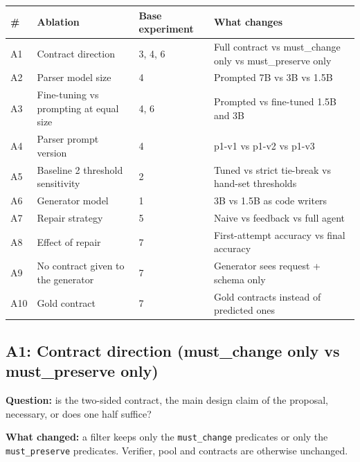 \documentclass[11pt]{article}
\begin{document}
\begin{table}[!tp]
\centering\footnotesize\setlength{\tabcolsep}{3pt}\renewcommand{\arraystretch}{1.1}
\begin{tabularx}{\textwidth}{l>{\raggedright\arraybackslash}Xl>{\raggedright\arraybackslash}X}
\toprule
\textbf{\#} & \textbf{Ablation} & \textbf{Base experiment} & \textbf{What changes} \\
\midrule
A1 & Contract direction & 3, 4, 6 & Full contract vs must\_change only vs must\_preserve only \\
A2 & Parser model size & 4 & Prompted 7B vs 3B vs 1.5B \\
A3 & Fine-tuning vs prompting at equal size & 4, 6 & Prompted vs fine-tuned 1.5B and 3B \\
A4 & Parser prompt version & 4 & p1-v1 vs p1-v2 vs p1-v3 \\
A5 & Baseline 2 threshold sensitivity & 2 & Tuned vs strict tie-break vs hand-set thresholds \\
A6 & Generator model & 1 & 3B vs 1.5B as code writers \\
A7 & Repair strategy & 5 & Naive vs feedback vs full agent \\
A8 & Effect of repair & 7 & First-attempt accuracy vs final accuracy \\
A9 & No contract given to the generator & 7 & Generator sees request + schema only \\
A10 & Gold contract & 7 & Gold contracts instead of predicted ones \\
\bottomrule
\end{tabularx}
\end{table}

\subsection{A1: Contract direction (must\_change only vs must\_preserve
only)}

\textbf{Question:} is the two-sided contract, the main design claim of
the proposal, necessary, or does one half suffice?

\textbf{What changed:} a filter keeps only the
\texttt{must\_\allowbreak{}change} predicates or only the
\texttt{must\_\allowbreak{}preserve} predicates. Verifier, pool and
contracts are otherwise unchanged.
\end{document}
